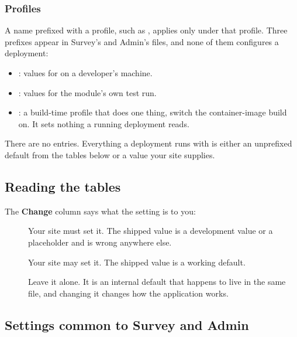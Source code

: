 \documentclass[11pt, a4paper]{article}
\begin{document}
\subsubsection*{Profiles}

A name prefixed with a profile, such as , applies only under that
profile. Three prefixes appear in Survey's and Admin's files, and none of them configures a
deployment:

\begin{itemize}
  \item {}: values for  on a developer's machine.
  \item {}: values for the module's own test run.
  \item {}: a build-time profile that does one thing, switch the container-image
        build on. It sets nothing a running deployment reads.
\end{itemize}

There are no  entries. Everything a deployment runs with is either an unprefixed
default from the tables below or a value your site supplies.

\subsection{Reading the tables}

The \textbf{Change} column says what the setting is to you:

\begin{description}
  \item[\chgset] Your site must set it. The shipped value is a development value or a
        placeholder and is wrong anywhere else.
  \item[\chgmay] Your site may set it. The shipped value is a working default.
  \item[\chgkeep] Leave it alone. It is an internal default that happens to live in the same
        file, and changing it changes how the application works.
\end{description}

\subsection{Settings common to Survey and Admin}
\end{document}
